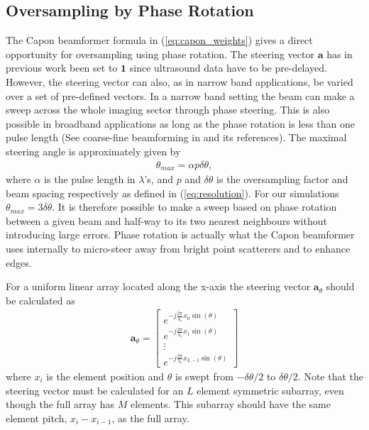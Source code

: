 \documentclass[draftcls]{IEEEtran}
\renewcommand{\vec}[1]{\mathbf{#1}}
\begin{document}
\subsection{Oversampling by Phase Rotation}
The Capon beamformer formula in (\ref{eq:capon_weights}) gives a direct opportunity for oversampling using phase rotation. The steering vector $\vec{a}$ has in previous work been set to $\vec{1}$ since ultrasound data have to be pre-delayed. However, the steering vector can also, as in narrow band applications, be varied over a set of pre-defined vectors. In a narrow band setting the beam can make a sweep across the whole imaging sector through phase steering. This is also possible in broadband applications as long as the phase rotation is less than one pulse length (See coarse-fine beamforming in \cite{Thomenius} and its references). The maximal steering angle is approximately given by
\begin{align}
\theta_{max} = \alpha p \delta\theta,
\end{align}
where $\alpha$ is the pulse length in $\lambda$'s, and $p$ and $\delta\theta$ is the oversampling factor and beam spacing respectively as defined in (\ref{eq:resolution}). For our simulations $\theta_{max} = 3\delta\theta$.
It is therefore possible to make a sweep based on phase rotation between a given beam and half-way to its two nearest neighbours without introducing large errors. Phase rotation is actually what the Capon beamformer uses internally to micro-steer away from bright point scatterers and to enhance edges.

For a uniform linear array located along the x-axis the steering vector $\vec{a}_\theta$ should be calculated as 
\begin{align}
\vec{a}_\theta = 
\begin{bmatrix}
e^{-j\frac{2\pi}{\lambda_c}x_0\sin(\theta)} \\
e^{-j\frac{2\pi}{\lambda_c}x_1\sin(\theta)} \\
\vdots \\ 
e^{-j\frac{2\pi}{\lambda_c}x_{L-1}\sin(\theta)}
\end{bmatrix}
\end{align}
where $x_i$ is the element position and $\theta$ is swept from $-\delta\theta/2$ to $\delta\theta/2$. Note that the steering vector must be calculated for an $L$ element symmetric subarray, even though the full array has $M$ elements. This subarray should have the same element pitch, $x_i - x_{i-1}$, as the full array. %
\end{document}
